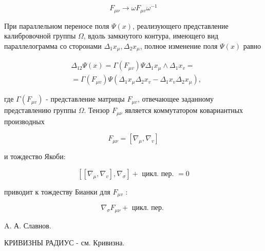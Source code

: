 \documentclass[10pt]{article}
\begin{document}
\[

F_{\mu \nu} \rightarrow \omega F_{\mu v} \omega^{-1}

\]



При параллельном переносе поля $\Psi(x)$, реализующего представление калибровочной группы $\Omega$, вдоль замкнутого контура, имеющего вид параллелограмма со сторонами $\Delta_{1} x_{\mu}, \Delta_{2} x_{\mu}$, полное изменение поля $\Psi(x)$ равно



\[

\begin{aligned}

& \Delta_{12} \Psi(x)=\Gamma\left(F_{\mu v}\right) \Psi \Delta_{1} x_{\mu} \wedge \Delta_{1} x_{v}= \\

& =\Gamma\left(F_{\mu v}\right) \Psi\left(\Delta_{1} x_{\mu} \Delta_{2} x_{v}-\Delta_{1} x_{v} \Delta_{2} x_{\mu}\right),

\end{aligned}

\]



где $\Gamma\left(F_{\mu v}\right)$ - представление матрицы $F_{\mu v}$, отвечающее заданному представлению группы $\Omega$. Тензор $F_{\mu \nu}$ является коммутатором ковариантных производных



\[

F_{\mu \nu}=\left[\nabla_{\mu}, \nabla_{v}\right]

\]



и тождество Якоби:



\[

\left[\left[\nabla_{\mu}, \nabla_{v}\right], \nabla_{\sigma}\right]+\text { цикл. пер. }=0

\]



приводит к тождеству Бианки для $F_{\mu v}$ :



\[

\nabla_{\sigma} F_{\mu \nu}+\text { цикл. пер. }

\]



A. А. Славнов.



КРИВИЗНЫ РАДИУС - см. Кривизна.
\end{document}
